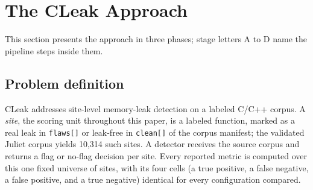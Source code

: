 \documentclass[a4paper]{llncs}
\begin{document}
\begin{table}[htbp]
\centering
\caption{Directional comparison of leak-detection systems. The systems
target different corpora and scoring protocols, so cells indicate
orientation rather than directly comparable measurements.}
\label{tab:taxonomy}
\footnotesize
{}
\end{table}

\section{The CLeak Approach}
\label{sec:arch}

This section presents the approach in three phases; stage letters A
to D name the pipeline steps inside them.

\subsection{Problem definition}
\label{sec:problem}

CLeak addresses site-level memory-leak detection on a labeled C/C++
corpus. A \emph{site}, the scoring unit throughout this paper, is a
labeled function, marked as a real leak in \texttt{flaws[]} or
leak-free in \texttt{clean[]} of the corpus manifest; the validated
Juliet corpus yields 10{,}314
such sites. A detector receives the source corpus and returns a flag or
no-flag decision per site. Every reported metric is computed over this
one fixed universe of sites, with its four cells (a true positive, a
false negative, a false positive, and a true negative) identical for
every configuration compared.
\end{document}
